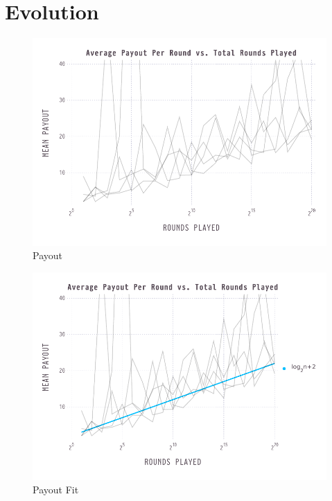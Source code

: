 \documentclass{article}
\begin{document}
\section{Evolution}

\begin{figure}[htb]
  \centering
  \includegraphics[width=\textwidth]{average-over-time}
  \caption{Payout}
\end{figure}

\begin{figure}[htb]
  \centering
  \includegraphics[width=\textwidth]{average-over-time-fit}
  \caption{Payout Fit}
\end{figure}
\end{document}
